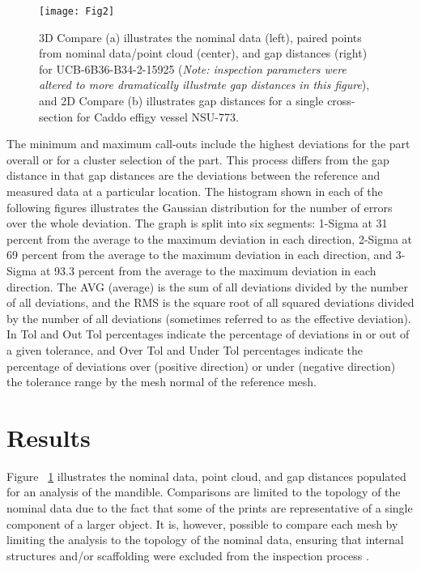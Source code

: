 \documentclass[review]{elsarticle}
\begin{document}
\begin{figure}[ht]\centering
\texttt{[image: Fig2]}
\caption{3D Compare (a) illustrates the nominal data (left), paired points from nominal data/point cloud (center), and gap distances (right) for UCB-6B36-B34-2-15925 (\textit{Note: inspection parameters were altered to more dramatically illustrate gap distances in this figure}), and 2D Compare (b) illustrates gap distances for a single cross-section for Caddo effigy vessel NSU-773.}
\label{fig:Fig2}
\end{figure}

The minimum and maximum call-outs include the highest deviations for the part overall or for a cluster selection of the part. This process differs from the gap distance in that gap distances are the deviations between the reference and measured data at a particular location. The histogram shown in each of the following figures illustrates the Gaussian distribution for the number of errors over the whole deviation. The graph is split into six segments: 1-Sigma at 31 percent from the average to the maximum deviation in each direction, 2-Sigma at 69 percent from the average to the maximum deviation in each direction, and 3-Sigma at 93.3 percent from the average to the maximum deviation in each direction. The AVG (average) is the sum of all deviations divided by the number of all deviations, and the RMS is the square root of all squared deviations divided by the number of all deviations (sometimes referred to as the effective deviation). In Tol and Out Tol percentages indicate the percentage of deviations in or out of a given tolerance, and Over Tol and Under Tol percentages indicate the percentage of deviations over (positive direction) or under (negative direction) the tolerance range by the mesh normal of the reference mesh.

\section*{Results}

Figure ~\ref{fig:Fig2} illustrates the nominal data, point cloud, and gap distances populated for an analysis of the mandible. Comparisons are limited to the topology of the nominal data due to the fact that some of the prints are representative of a single component of a larger object. It is, however, possible to compare each mesh by limiting the analysis to the topology of the nominal data, ensuring that internal structures and/or scaffolding were excluded from the inspection process \citep{RN5940}.
\end{document}
